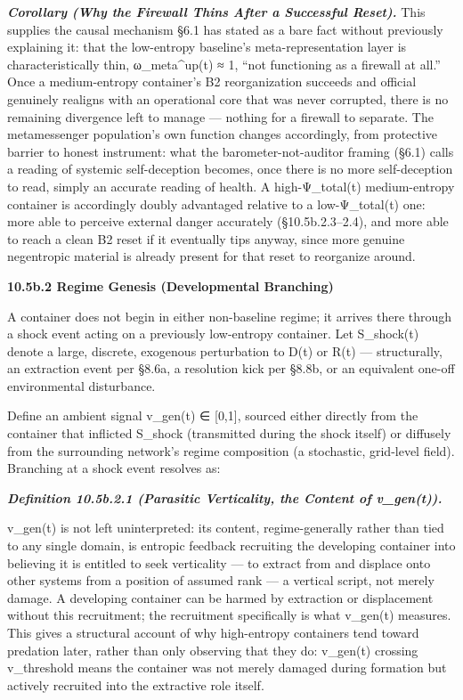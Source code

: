 \documentclass[
]{article}
\begin{document}
\emph{\textbf{Corollary (Why the Firewall Thins After a Successful
Reset).}} This supplies the causal mechanism §6.1 has stated as a bare
fact without previously explaining it: that the low-entropy baseline's
meta-representation layer is characteristically thin, ω\_meta\^{}up(t) ≈
1, ``not functioning as a firewall at all.'' Once a medium-entropy
container's B2 reorganization succeeds and official genuinely realigns
with an operational core that was never corrupted, there is no remaining
divergence left to manage --- nothing for a firewall to separate. The
metamessenger population's own function changes accordingly, from
protective barrier to honest instrument: what the barometer-not-auditor
framing (§6.1) calls a reading of systemic self-deception becomes, once
there is no more self-deception to read, simply an accurate reading of
health. A high-Ψ\_total(t) medium-entropy container is accordingly
doubly advantaged relative to a low-Ψ\_total(t) one: more able to
perceive external danger accurately (§10.5b.2.3--2.4), and more able to
reach a clean B2 reset if it eventually tips anyway, since more genuine
negentropic material is already present for that reset to reorganize
around.

\textbf{10.5b.2 Regime Genesis (Developmental Branching)}

A container does not begin in either non-baseline regime; it arrives
there through a shock event acting on a previously low-entropy
container. Let S\_shock(t) denote a large, discrete, exogenous
perturbation to D(t) or R(t) --- structurally, an extraction event per
§8.6a, a resolution kick per §8.8b, or an equivalent one-off
environmental disturbance.

Define an ambient signal v\_gen(t) ∈ {[}0,1{]}, sourced either directly
from the container that inflicted S\_shock (transmitted during the shock
itself) or diffusely from the surrounding network's regime composition
(a stochastic, grid-level field). Branching at a shock event resolves
as:

\emph{\textbf{Definition 10.5b.2.1 (Parasitic Verticality, the Content
of v\_gen(t)).}}

v\_gen(t) is not left uninterpreted: its content, regime-generally
rather than tied to any single domain, is entropic feedback recruiting
the developing container into believing it is entitled to seek
verticality --- to extract from and displace onto other systems from a
position of assumed rank --- a vertical script, not merely damage. A
developing container can be harmed by extraction or displacement without
this recruitment; the recruitment specifically is what v\_gen(t)
measures. This gives a structural account of why high-entropy containers
tend toward predation later, rather than only observing that they do:
v\_gen(t) crossing v\_threshold means the container was not merely
damaged during formation but actively recruited into the extractive role
itself.
\end{document}
